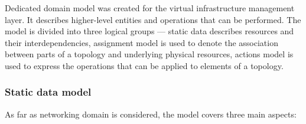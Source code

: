 \documentclass[11pt,openany]{book}
\begin{document}
        Dedicated domain model was created for the virtual infrastructure management layer. It describes higher-level
        entities and operations that can be performed. The model is divided into three logical groups --- static data
        describes resources and their interdependencies, assignment model is used to denote the association between
        parts of a topology and underlying physical resources, actions model is used to express the operations that can
        be applied to elements of a topology.


        \subsubsection{Static data model}

          As far as networking domain is considered, the model covers three main aspects:
\end{document}
